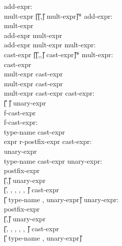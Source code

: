 \begin{center}
\PAIR
{
add-expr: \\
\>	mult-expr \U{[}\U{[}\T{+},\T{-}\U{]} mult-expr\U{]}*
}
{
add-expr: \\
\>	mult-expr\\
\>	add-expr \T{+} mult-expr\\
\>	add-expr \T{-} mult-expr
}
\PAIR
{
mult-expr:\\
\>	cast-expr \U{[}\U{[}\T{*},\T{/},\T{\%}\U{]} cast-expr\U{]}*
}
{
mult-expr:\\
\>	cast-expr\\
\>	mult-expr \T{*} cast-expr\\
\>	mult-expr \T{/} cast-expr\\
\>	mult-expr \T{\%} cast-expr
}
\PAIR
{
cast-expr:\\
\>	\U{[}\U{\circumflex} \T{(}\U{]}  unary-expr\\
\>	\T{(} f-cast-expr \\
f-cast-expr:\\
\>	type-name \T{)} cast-expr\\
\>	expr \T{)} r-postfix-expr
}
{
cast-expr:\\
\>	unary-expr\\
\>	\T{(} type-name \T{)} cast-expr	
}
\PAIR
{
unary-expr:\\
\>	postfix-expr\\
\>	\U{[}\T{++},\T{--}\U{]}  unary-expr\\
\>	\U{[}\T{\&}, \T{*}, \T{+}, \T{-}, \T{\~{}}, \T{!}\U{]}  cast-expr\\
\>	 \U{[}\T{(} type-name \T{)}, unary-expr\U{]}
}
{
unary-expr:\\
\>	postfix-expr\\
\>	\U{[}\T{++},\T{--}\U{]}  unary-expr\\
\>	\U{[}\T{\&}, \T{*}, \T{+}, \T{-}, \T{\~{}}, \T{!}\U{]} cast-expr\\
\>	 \U{[}\T{(} type-name \T{)}, unary-expr\U{]}
}


\end{center}
